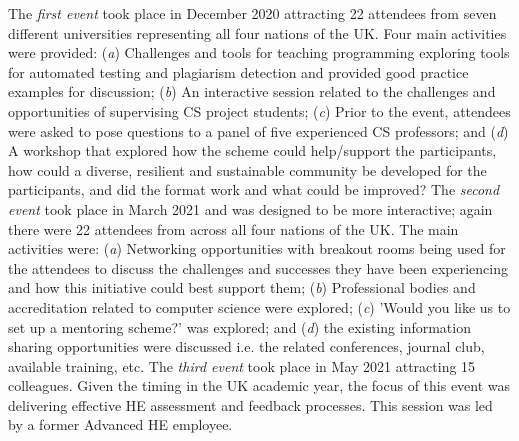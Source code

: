 \documentclass[sigconf]{acmart}
\begin{document}
\begin{comment}
The scheme was formally initiated in December 2020. To date three
developmental/networking events have been delivered online, primarily
due to the impacts of the ongoing COVID-19 pandemic. Alternative
approaches would have been considered in other circumstances. However
many of the participants at the workshops highlighted that due to
competing work-pressures and expense issues they preferred the adopted
virtual format. Following each event, feedback was sought by a
post-event survey; the outcomes of these surveys are explored in
Section~\ref{Sec:DoesItWork}.
\end{comment}
The {\emph{first event}} took place in December 2020 attracting 22
attendees from seven different universities representing all four
nations of the UK. Four main activities were provided: ({\emph{a}})
Challenges and tools for teaching programming exploring tools for
automated testing and plagiarism detection and provided good practice
examples for discussion; ({\emph{b}}) An interactive session related
to the challenges and opportunities of supervising CS project
students; ({\emph{c}}) Prior to the event, attendees were asked to
pose questions to a panel of five experienced CS professors; and
({\emph{d}}) A workshop that explored how the scheme could
help/support the participants, how could a diverse, resilient and
sustainable community be developed for the participants, and did the
format work and what could be improved? The {\emph{second event}} took
place in March 2021 and was designed to be more interactive; again
there were 22 attendees from across all four nations of the UK. The
main activities were: ({\emph{a}}) Networking opportunities with
breakout rooms being used for the attendees to discuss the challenges
and successes they have been experiencing and how this initiative
could best support them; ({\emph{b}}) Professional bodies and
accreditation related to computer science were explored; ({\emph{c}})
'Would you like us to set up a mentoring scheme?' was explored; and
({\emph{d}}) the existing information sharing opportunities were
discussed i.e. the related conferences, journal club, available
training, etc. The {\emph{third event}} took place in May 2021
attracting 15 colleagues. Given the timing in the UK academic year,
the focus of this event was delivering effective HE assessment and
feedback processes. This session was led by a former Advanced HE
employee.
\end{document}
